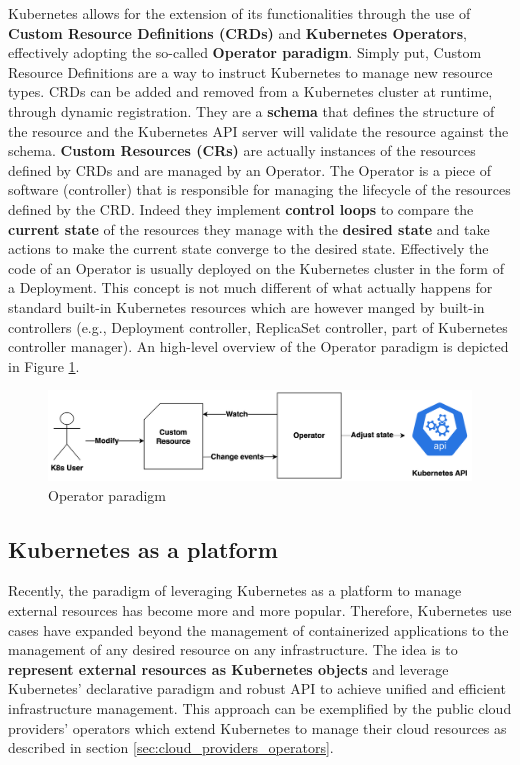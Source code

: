 
Kubernetes allows for the extension of its functionalities through the use of \textbf{Custom Resource Definitions (CRDs)} and \textbf{Kubernetes Operators}, effectively adopting the so-called \textbf{Operator paradigm}.
Simply put, Custom Resource Definitions are a way to instruct Kubernetes to manage new resource types. 
CRDs can be added and removed from a Kubernetes cluster at runtime, through dynamic registration.
They are a \textbf{schema} that defines the structure of the resource and the Kubernetes API server will validate the resource against the schema.
\textbf{Custom Resources (CRs)} are actually instances of the resources defined by CRDs and are managed by an Operator.
The Operator is a piece of software (controller) that is responsible for managing the lifecycle of the resources defined by the CRD.
Indeed they implement \textbf{control loops} to compare the \textbf{current state} of the resources they manage with the \textbf{desired state} and take actions to make the current state converge to the desired state.
Effectively the code of an Operator is usually deployed on the Kubernetes cluster in the form of a Deployment.
This concept is not much different of what actually happens for standard built-in Kubernetes resources which are however manged by built-in controllers (e.g., Deployment controller, ReplicaSet controller, part of Kubernetes controller manager).
An high-level overview of the Operator paradigm is depicted in Figure \ref{fig:operator_paradigm}.

\begin{figure}[H]
    \centering
    \includegraphics[width=1\linewidth]{images/opeartor_paradigm.png}
    \caption{Operator paradigm}
    \label{fig:operator_paradigm}
\end{figure}

\subsection{Kubernetes as a platform}

Recently, the paradigm of leveraging Kubernetes as a platform to manage external resources has become more and more popular.
Therefore, Kubernetes use cases have expanded beyond the management of containerized applications to the management of any desired resource on any infrastructure.
The idea is to \textbf{represent external resources as Kubernetes objects} and leverage Kubernetes' declarative paradigm and robust API to achieve unified and efficient infrastructure management.
This approach can be exemplified by the public cloud providers' operators which extend Kubernetes to manage their cloud resources as described in section \ref{sec:cloud_providers_operators}.

